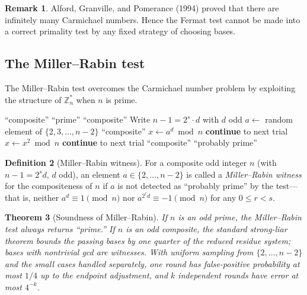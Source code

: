\documentclass[twoside,12pt]{book}
\theoremstyle{plain}
\newtheorem{theorem}{Theorem}[chapter]
\theoremstyle{definition}
\newtheorem{definition}[theorem]{Definition}
\newtheorem{remark}[theorem]{Remark}
\theoremstyle{remark}
\begin{document}
\begin{remark}
Alford, Granville, and Pomerance (1994) proved that there are infinitely many Carmichael numbers. Hence the Fermat test cannot be made into a correct primality test by any fixed strategy of choosing bases.
\end{remark}

\subsection{The Miller--Rabin test}

The Miller--Rabin test overcomes the Carmichael number problem by exploiting the structure of $\mathbb{Z}_n^*$ when $n$ is prime.

\begin{algorithm}
\caption{Miller--Rabin Primality Test}
\label{alg:miller-rabin}
\begin{algorithmic}[1]
 
        \State \Return ``composite''
    \EndIf
        \State \Return ``prime''
    \EndIf
        \State \Return ``composite''
    \EndIf
    \State Write $n - 1 = 2^s \cdot d$ with $d$ odd
    \State $a \gets$ random element of $\{2, 3, \ldots, n-2\}$
        \State \Return ``composite''
    \EndIf
        \State $x \gets a^d \bmod n$
            \State \textbf{continue} to next trial
        \EndIf
            \State $x \gets x^2 \bmod n$
                \State \textbf{continue} to next trial
            \EndIf
        \EndFor
        \State \Return ``composite''
    \EndFor
    \State \Return ``probably prime''
\EndFunction
\end{algorithmic}
\end{algorithm}

\begin{definition}[Miller--Rabin witness]
For a composite odd integer $n$ (with $n - 1 = 2^s d$, $d$ odd), an element $a \in \{2, \ldots, n-2\}$ is called a \emph{Miller--Rabin witness} for the compositeness of $n$ if $a$ is not detected as ``probably prime'' by the test---that is, neither $a^d \equiv 1 \pmod{n}$ nor $a^{2^r d} \equiv -1 \pmod{n}$ for any $0 \leq r < s$.
\end{definition}

\begin{theorem}[Soundness of Miller--Rabin]
\label{thm:miller-rabin}
If $n$ is an odd prime, the Miller--Rabin test always returns ``prime.'' If
$n$ is an odd composite, the standard strong-liar theorem bounds the passing
bases by one quarter of the reduced residue system; bases with nontrivial gcd
are witnesses. With uniform sampling from $\{2,\ldots,n-2\}$ and the small
cases handled separately, one round has false-positive probability at most
$1/4$ up to the endpoint adjustment, and $k$ independent rounds have error at
most $4^{-k}$.
\end{theorem}
\end{document}
